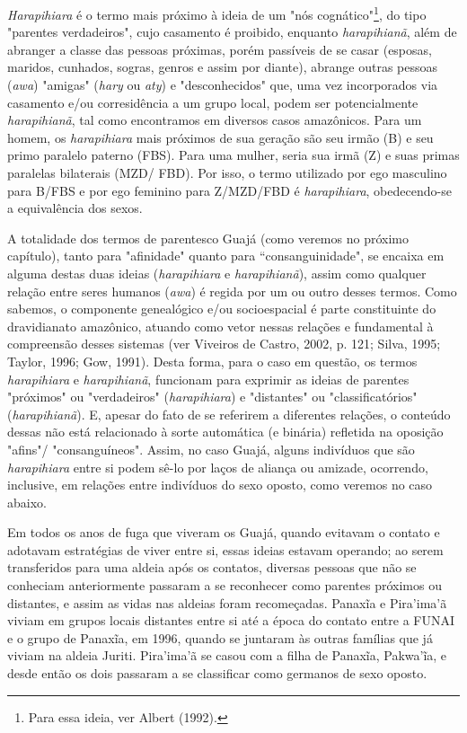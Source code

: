 \emph{Harapihiara} é o termo mais próximo à ideia de um "nós
cognático"\footnote{Para essa ideia, ver Albert (1992).}, do tipo
"parentes verdadeiros", cujo casamento é proibido, enquanto
\emph{harapihianã}, além de abranger a classe das pessoas próximas,
porém passíveis de se casar (esposas, maridos, cunhados, sogras, genros
e assim por diante), abrange outras pessoas (\emph{awa}) "amigas"
(\emph{hary} ou \emph{aty}) e "desconhecidos" que, uma vez incorporados
via casamento e/ou corresidência a um grupo local, podem ser
potencialmente \emph{harapihianã}, tal como encontramos em diversos
casos amazônicos. Para um homem, os \emph{harapihiara} mais próximos de
sua geração são seu irmão (B) e seu primo paralelo paterno (FBS). Para
uma mulher, seria sua irmã (Z) e suas primas paralelas bilaterais (MZD/
FBD). Por isso, o termo utilizado por ego masculino para B/FBS e por ego
feminino para Z/MZD/FBD é \emph{harapihiara}, obedecendo-se a
equivalência dos sexos.

A totalidade dos termos de parentesco Guajá (como veremos no próximo
capítulo), tanto para "afinidade" quanto para ``consanguinidade", se
encaixa em alguma destas duas ideias (\emph{harapihiara} e
\emph{harapihianã}), assim como qualquer relação entre seres humanos
(\emph{awa}) é regida por um ou outro desses termos. Como sabemos, o
componente genealógico e/ou socioespacial é parte constituinte do
dravidianato amazônico, atuando como vetor nessas relações e fundamental
à compreensão desses sistemas (ver Viveiros de Castro, 2002, p. 121;
Silva, 1995; Taylor, 1996; Gow, 1991). Desta forma, para o caso em
questão, os termos \emph{harapihiara} e \emph{harapihianã}, funcionam
para exprimir as ideias de parentes "próximos" ou "verdadeiros"
(\emph{harapihiara}) e "distantes" ou "classificatórios"
(\emph{harapihianã}). E, apesar do fato de se referirem a diferentes
relações, o conteúdo dessas não está relacionado à sorte automática (e
binária) refletida na oposição "afins"/ "consanguíneos". Assim, no caso
Guajá, alguns indivíduos que são \emph{harapihiara} entre si podem sê-lo
por laços de aliança ou amizade, ocorrendo, inclusive, em relações entre
indivíduos do sexo oposto, como veremos no caso abaixo.

Em todos os anos de fuga que viveram os Guajá, quando evitavam o contato
e adotavam estratégias de viver entre si, essas ideias estavam operando;
ao serem transferidos para uma aldeia após os contatos, diversas pessoas
que não se conheciam anteriormente passaram a se reconhecer como
parentes próximos ou distantes, e assim as vidas nas aldeias foram
recomeçadas. Panaxĩa e Pira'ima'ã viviam em grupos locais distantes
entre si até a época do contato entre a FUNAI e o grupo de Panaxĩa, em
1996, quando se juntaram às outras famílias que já viviam na aldeia
Juriti. Pira'ima'ã se casou com a filha de Panaxĩa, Pakwa'ĩa, e desde
então os dois passaram a se classificar como germanos de sexo oposto.

